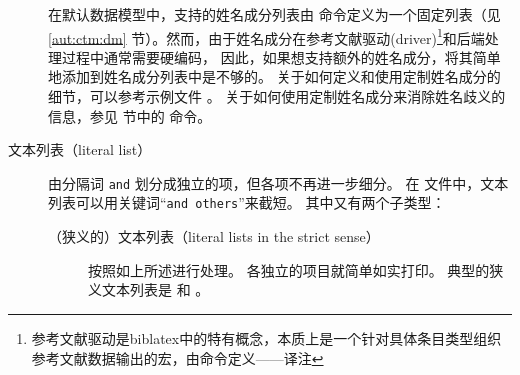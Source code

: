 \begin{description}

在默认数据模型中，支持的姓名成分列表由  命令定义为一个固定列表（见 \ref{aut:ctm:dm} 节）。然而，由于姓名成分在参考文献驱动(driver)\footnote{参考文献驱动是biblatex中的特有概念，本质上是一个针对具体条目类型组织参考文献数据输出的宏，由命令定义——译注}和后端处理过程中通常需要硬编码，
因此，如果想支持额外的姓名成分，将其简单地添加到姓名成分列表中是不够的。
关于如何定义和使用定制姓名成分的细节，可以参考示例文件 。
关于如何使用定制姓名成分来消除姓名歧义的信息，参见  节中的  命令。

\item[文本列表（literal list）] 由分隔词 \texttt{and} 划分成独立的项，但各项不再进一步细分。
在  文件中，文本列表可以用关键词“\texttt{and others}”来截短。
其中又有两个子类型：

\begin{description}

\item[（狭义的）文本列表（literal lists in the strict sense）] 按照如上所述进行处理。
各独立的项目就简单如实打印。
典型的狭义文本列表是  和 。




\end{description}
\end{description}
